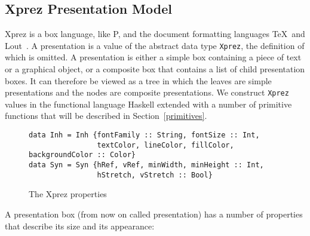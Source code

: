 %																
\subsection{{\sc Xprez} Presentation Model}

{\sc Xprez} is a box language, like P, and the document formatting languages \TeX ~and Lout~\cite{lout}. A presentation is a value of the abstract data type \texttt{Xprez}, the definition of which is omitted. A presentation is either a simple box containing a piece of text or a graphical object, or a composite box that contains a list of child presentation boxes. It can therefore be viewed as a tree in which the leaves are simple presentations and the nodes are composite presentations. We construct \texttt{Xprez} values in the functional language Haskell extended with a number of primitive functions that will be described in Section~\ref{primitives}.

\begin{figure}
\begin{small}
\begin{center}
\begin{small}
\begin{verbatim}
data Inh = Inh {fontFamily :: String, fontSize :: Int,
                textColor, lineColor, fillColor, backgroundColor :: Color} 
data Syn = Syn {hRef, vRef, minWidth, minHeight :: Int,
                hStretch, vStretch :: Bool}
\end{verbatim}
\end{small}
\caption{The {\sc Xprez} properties}\label{xprezproperties} 
\end{center}
\end{small}
\end{figure}
\pagebreak

A presentation box (from now on called presentation) has a number of properties that describe its size and its appearance: 

\begin{center}
\end{center}

